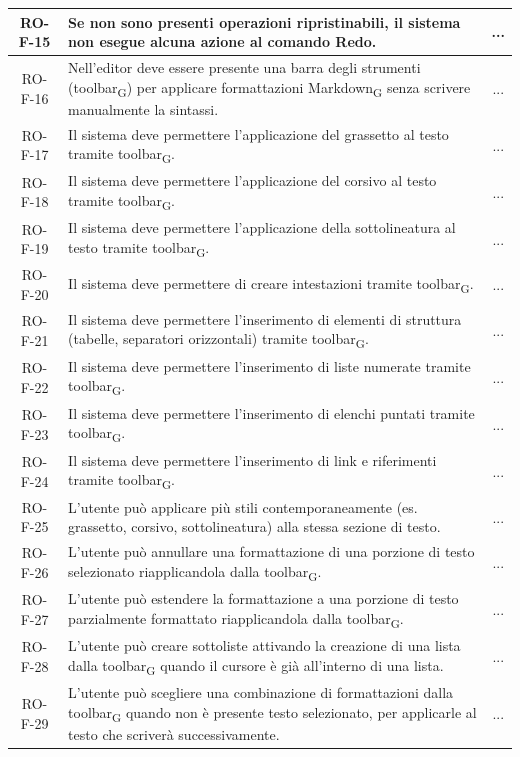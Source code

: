 \documentclass[11pt,a4paper]{article}
\newcommand{\gls}[1]{#1\textsubscript{G}}
\begin{document}
\begin{longtable}{|c|p{11cm}|c|}
\hline
RO-F-15 & Se non sono presenti operazioni ripristinabili, il sistema non esegue alcuna azione al comando Redo. & ... \\
\hline
RO-F-16 & Nell'editor deve essere presente una barra degli strumenti (\gls{toolbar}) per applicare formattazioni \gls{Markdown} senza scrivere manualmente la sintassi. & ... \\
\hline
RO-F-17 & Il sistema deve permettere l'applicazione del grassetto al testo tramite \gls{toolbar}. & ... \\
\hline
RO-F-18 & Il sistema deve permettere l'applicazione del corsivo al testo tramite \gls{toolbar}. & ... \\
\hline
RO-F-19 & Il sistema deve permettere l'applicazione della sottolineatura al testo tramite \gls{toolbar}. & ... \\
\hline
RO-F-20 & Il sistema deve permettere di creare intestazioni tramite \gls{toolbar}. & ... \\
\hline
RO-F-21 & Il sistema deve permettere l'inserimento di elementi di struttura (tabelle, separatori orizzontali) tramite \gls{toolbar}. & ... \\
\hline
RO-F-22 & Il sistema deve permettere l'inserimento di liste numerate tramite \gls{toolbar}. & ... \\
\hline
RO-F-23 & Il sistema deve permettere l'inserimento di elenchi puntati tramite \gls{toolbar}. & ... \\
\hline
RO-F-24 & Il sistema deve permettere l'inserimento di link e riferimenti tramite \gls{toolbar}. & ... \\
\hline
RO-F-25 & L'utente può applicare più stili contemporaneamente (es. grassetto, corsivo, sottolineatura) alla stessa sezione di testo. & ... \\
\hline
RO-F-26 & L'utente può annullare una formattazione di una porzione di testo selezionato riapplicandola dalla \gls{toolbar}. & ... \\
\hline
RO-F-27 & L'utente può estendere la formattazione a una porzione di testo parzialmente formattato riapplicandola dalla \gls{toolbar}. & ... \\
\hline
RO-F-28 & L'utente può creare sottoliste attivando la creazione di una lista dalla \gls{toolbar} quando il cursore è già all'interno di una lista. & ... \\
\hline
RO-F-29 & L'utente può scegliere una combinazione di formattazioni dalla \gls{toolbar} quando non è presente testo selezionato, per applicarle al testo che scriverà successivamente. & ... \\

\end{longtable}
\end{document}
